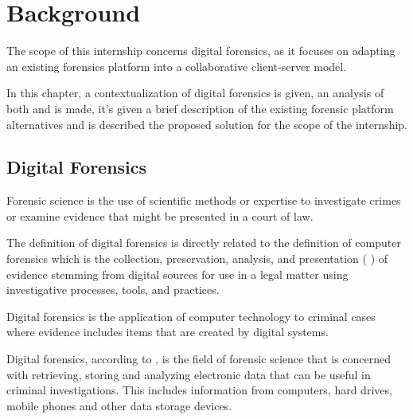 


\chapter{Background}
\label{ch:background}

The scope of this internship concerns digital forensics, as it focuses on adapting an existing forensics platform into a collaborative client-server model.

In this chapter, a contextualization of digital forensics is given, an analysis of both  \cite{sleuthkit} and  \cite{autopsy} is made, it's given a brief description of
the existing forensic platform alternatives and is described the proposed solution for the scope of the internship.

\section{Digital Forensics}

Forensic science is the use of scientific methods or expertise to investigate crimes
or examine evidence that might be presented in a court of law.

The definition of digital forensics is directly related to the definition of
computer forensics which is the collection, preservation, analysis,
and presentation ( \cite{daniels}) of evidence stemming from digital sources for use in a legal matter
using investigative processes, tools, and practices.

Digital forensics is the application of computer technology to criminal cases where evidence
includes items that are created by digital systems.

Digital forensics, according to \citeauthor{nist} \cite{nist}, is the field of forensic science that is concerned with retrieving,
storing and analyzing electronic data that can be useful in criminal investigations.
This includes information from computers, hard drives, mobile phones and other data
storage devices.

